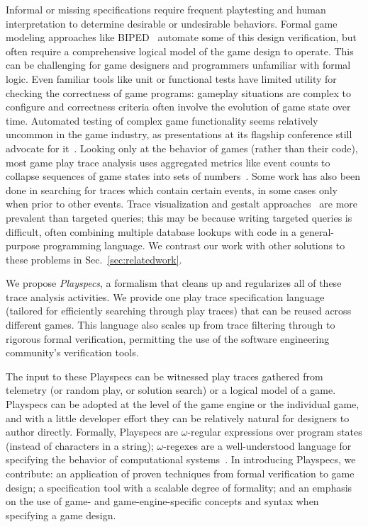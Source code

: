 \documentclass[letterpaper]{article}
\begin{document}
Informal or missing specifications require frequent playtesting and human interpretation to determine desirable or undesirable behaviors. Formal game modeling approaches like BIPED~\cite{smith2009computational} automate some of this design verification, but often require a comprehensive logical model of the game design to operate. This can be challenging for game designers and programmers unfamiliar with formal logic. Even familiar tools like unit or functional tests have limited utility for checking the correctness of game programs: gameplay situations are complex to configure and correctness criteria often involve the evolution of game state over time. Automated testing of complex game functionality seems relatively uncommon in the game industry, as presentations at its flagship conference still advocate for it~\cite{duboisTesting,provincianoTesting}.
Looking only at the behavior of games (rather than their code), most game play trace analysis uses aggregated metrics like event counts to collapse sequences of game states into sets of numbers~\cite{el2013game}. Some work has also been done in searching for traces which contain certain events, in some cases only when prior to other events. Trace visualization and gestalt approaches~\cite{liu2011feature,osborn2014game} are more prevalent than targeted queries; this may be because writing targeted queries is difficult, often combining multiple database lookups with code in a general-purpose programming language. We contrast our work with other solutions to these problems in Sec.~\ref{sec:relatedwork}.

We propose \emph{Playspecs}, a formalism that cleans up and regularizes all of these trace analysis activities. We provide one play trace specification language (tailored for efficiently searching through play traces) that can be reused across different games. This language also scales up from trace filtering through to rigorous formal verification, permitting the use of the software engineering community's verification tools.

The input to these Playspecs can be witnessed play traces gathered from telemetry (or random play, or solution search) or a logical model of a game. Playspecs can be adopted at the level of the game engine or the individual game, and with a little developer effort they can be relatively natural for designers to author directly.
Formally, Playspecs are $\omega$-regular expressions over program states (instead of characters in a string); 
$\omega$-regexes are a well-understood language for specifying the behavior of computational systems~\cite{albin2004property}. In introducing Playspecs, we contribute: an application of proven techniques from formal verification to game design; a specification tool with a scalable degree of formality; and an emphasis on the use of game- and game-engine-specific concepts and syntax when specifying a game design.
\end{document}
